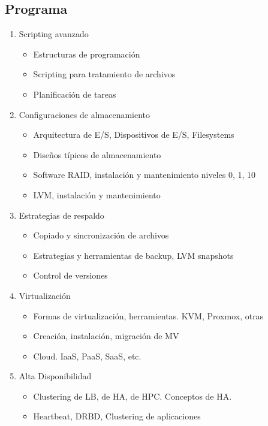 \subsection {Programa}
\begin{enumerate}
\item Scripting avanzado
\begin{itemize}
	\item Estructuras de programación
	\item Scripting para tratamiento de archivos
	\item Planificación de tareas
\end{itemize}

\item Configuraciones de almacenamiento
\begin{itemize}
	\item Arquitectura de E/S, Dispositivos de E/S, Filesystems
	\item	Diseños típicos de almacenamiento
	\item	Software RAID, instalación y mantenimiento niveles 0, 1, 10
	\item	LVM, instalación y mantenimiento	 
\end{itemize}
	
\item Estrategias de respaldo
\begin{itemize}
	\item Copiado y sincronización de archivos
	\item Estrategias y herramientas de backup, LVM snapshots
	\item Control de versiones
\end{itemize}
\item Virtualización
\begin{itemize}
	\item Formas de virtualización, herramientas. KVM, Proxmox, otras
	\item Creación, instalación, migración de MV
	\item Cloud. IaaS, PaaS, SaaS, etc.
\end{itemize}
\item Alta Disponibilidad
\begin{itemize}
	\item Clustering de LB, de HA, de HPC. Conceptos de HA.
	\item Heartbeat, DRBD, Clustering de aplicaciones
\end{itemize}
\end{enumerate}

